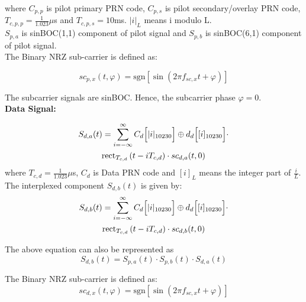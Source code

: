 \noindent where $C_{p,p}$ is pilot primary PRN code, $C_{p,s}$ is pilot secondary/overlay PRN code, 
$T_{c,p,p} = \frac{1}{1.023}\mu$s and $T_{c,p,s}= 10$ms. $|i|_{L}$ means i modulo L.\\

\noindent $S_{p,a}$ is sinBOC(1,1) component of pilot signal and $S_{p,b}$ is sinBOC(6,1) component 
of pilot signal.
\\

\noindent The Binary NRZ sub-carrier is defined as:

\begin{equation}
sc_{p,x}(t, \varphi) = \text{sgn}[\sin(2\pi f_{sc,x}t + \varphi)]
\label{eq:sub_carrier}
\end{equation}

\noindent The subcarrier signals are sinBOC. Hence, the subcarrier phase $\varphi=0$. \\
\noindent\textbf{Data Signal:}

\begin{multline}
S_{d,a}(t) = \sum_{i=-\infty}^{\infty} C_d\Bigl[|i|_{10230} \Bigr] \oplus d_d\Bigl[[i]_{10230}\Bigr] \cdot \\
\text{rect} _{T_{c,d}} \left({t - iT_{c,d}}\right) \cdot sc_{d,a}(t, 0)
\label{eq:signal_da}
\end{multline}
\noindent where $T_{c,d} = \frac{1}{1.023}\mu$s, $C_d$ is Data PRN code and $[i]_L$ means the integer part of $\frac{i}{L}$.\\

\noindent The interplexed component $S_{d,b}(t)$ is given by:
\begin{multline}
S_{d,b}(t) = \sum_{i=-\infty}^{\infty} C_d\Bigl[|i|_{10230}\Bigr] \oplus d_d\Bigl[[i]_{10230}\Bigr] \cdot \\
\text{rect}_{T_{c,d}} \left( t - iT_{c,d} \right) \cdot sc_{d,b}(t, 0)
\label{eq:interplexed_component}
\end{multline}

\noindent The above equation can also be represented as
\begin{equation}
    S_{d,b}(t) = S_{p,a}(t) \cdot S_{p,b}(t) \cdot S_{d,a}(t)
    \label{eq:interplexed_component1}
\end{equation}

\noindent The Binary NRZ sub-carrier is defined as:
\begin{equation}
sc_{d,x}(t, \varphi) = \text{sgn}[\sin(2\pi f_{sc,x}t + \varphi)]
\label{eq:subcarrier_dc}
\end{equation}

